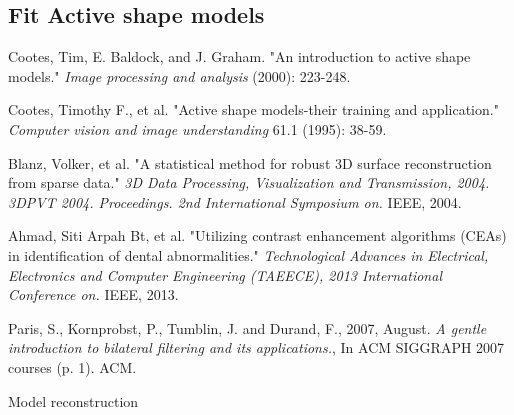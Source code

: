 \documentclass[a4paper]{article}
\begin{document}
\subsection{Fit Active shape models}

\begin{thebibliography}{99}

 Cootes, Tim, E. Baldock, and J. Graham. "An introduction to active shape models." \textit{Image processing and analysis} (2000): 223-248.

 Cootes, Timothy F., et al. "Active shape models-their training and application." \textit{Computer vision and image understanding} 61.1 (1995): 38-59.

 Blanz, Volker, et al. "A statistical method for robust 3D surface reconstruction from sparse data." \textit{3D Data Processing, Visualization and Transmission, 2004. 3DPVT 2004. Proceedings. 2nd International Symposium on.} IEEE, 2004.

 Ahmad, Siti Arpah Bt, et al. "Utilizing contrast enhancement algorithms (CEAs) in identification of dental abnormalities." \textit{Technological Advances in Electrical, Electronics and Computer Engineering (TAEECE), 2013 International Conference on.} IEEE, 2013.

 Paris, S., Kornprobst, P., Tumblin, J. and Durand, F., 2007, August. \textit{A gentle introduction to bilateral filtering and its applications.}, In ACM SIGGRAPH 2007 courses (p. 1). ACM.

Model reconstruction 

% 

\end{thebibliography}
\end{document}
